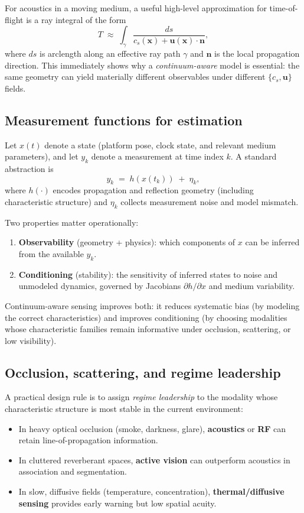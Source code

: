 \documentclass[11pt]{article}
\theoremstyle{defstyle}
\theoremstyle{mapstyle}
\begin{document}
For acoustics in a moving medium, a useful high-level approximation for time-of-flight is a ray integral of the form
\begin{equation}
T \;\approx\; \int_{\gamma}\frac{ds}{c_s(\mathbf{x})+\mathbf{u}(\mathbf{x})\cdot \mathbf{n}},
\end{equation}
where $ds$ is arclength along an effective ray path $\gamma$ and $\mathbf{n}$ is the local propagation direction.
This immediately shows why a \emph{continuum-aware} model is essential: the same geometry can yield materially different observables under different $\{c_s,\mathbf{u}\}$ fields.

\subsection{Measurement functions for estimation}
Let $x(t)$ denote a state (platform pose, clock state, and relevant medium parameters), and let $y_k$ denote a measurement at time index $k$.
A standard abstraction is
\begin{equation}
y_k \;=\; h(x(t_k)) \;+\; \eta_k,
\end{equation}
where $h(\cdot)$ encodes propagation and reflection geometry (including characteristic structure) and $\eta_k$ collects measurement noise and model mismatch.

Two properties matter operationally:
\begin{enumerate}[leftmargin=*, itemsep=3pt]
  \item \textbf{Observability} (geometry + physics): which components of $x$ can be inferred from the available $y_k$.
  \item \textbf{Conditioning} (stability): the sensitivity of inferred states to noise and unmodeled dynamics, governed by Jacobians $\partial h/\partial x$ and medium variability.
\end{enumerate}

Continuum-aware sensing improves both: it reduces systematic bias (by modeling the correct characteristics) and improves conditioning (by choosing modalities whose characteristic families remain informative under occlusion, scattering, or low visibility).

\subsection{Occlusion, scattering, and regime leadership}
A practical design rule is to assign \emph{regime leadership} to the modality whose characteristic structure is most stable in the current environment:
\begin{itemize}[leftmargin=*, itemsep=3pt]
  \item In heavy optical occlusion (smoke, darkness, glare), \textbf{acoustics} or \textbf{RF} can retain line-of-propagation information.
  \item In cluttered reverberant spaces, \textbf{active vision} can outperform acoustics in association and segmentation.
  \item In slow, diffusive fields (temperature, concentration), \textbf{thermal/diffusive sensing} provides early warning but low spatial acuity.
\end{itemize}
\end{document}
